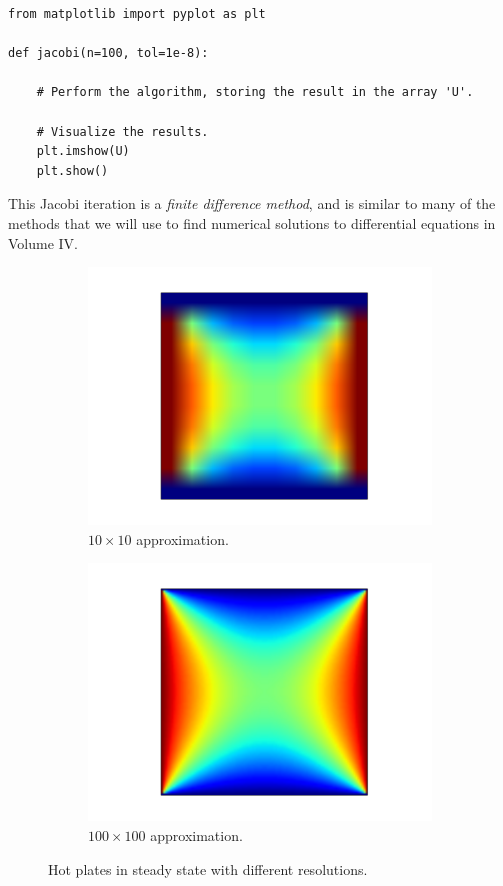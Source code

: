 \begin{problem}
\begin{lstlisting}
from matplotlib import pyplot as plt

def jacobi(n=100, tol=1e-8):
    
    # Perform the algorithm, storing the result in the array 'U'.

    # Visualize the results.
    plt.imshow(U)
    plt.show()
\end{lstlisting}

This Jacobi iteration is a \emph{finite difference method}, and is similar to many of the methods that we will use to find numerical solutions to differential equations in Volume IV.
\end{problem}

\begin{figure}[H]
\centering
\begin{subfigure}{.5\textwidth}
    \centering
    \includegraphics[width=\linewidth]{jacobi_small.pdf}
    \caption{$10\times 10$ approximation.}
\end{subfigure}%
\begin{subfigure}{.5\textwidth}
    \centering
    \includegraphics[width=\linewidth]{jacobi_big.pdf}
    \caption{$100\times 100$ approximation.}
\end{subfigure}
\caption{Hot plates in steady state with different resolutions.}
\end{figure}

